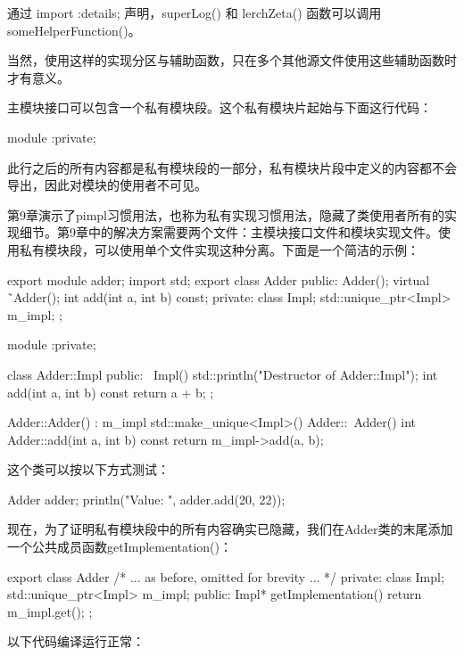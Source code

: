 通过 import :details; 声明，superLog() 和 lerchZeta() 函数可以调用 someHelperFunction()。

当然，使用这样的实现分区与辅助函数，只在多个其他源文件使用这些辅助函数时才有意义。


主模块接口可以包含一个私有模块段。这个私有模块片起始与下面这行代码：

\begin{cpp}
module :private;
\end{cpp}

此行之后的所有内容都是私有模块段的一部分，私有模块片段中定义的内容都不会导出，因此对模块的使用者不可见。

第9章演示了pimpl习惯用法，也称为私有实现习惯用法，隐藏了类使用者所有的实现细节。第9章中的解决方案需要两个文件：主模块接口文件和模块实现文件。使用私有模块段，可以使用单个文件实现这种分离。下面是一个简洁的示例：

\begin{cpp}
export module adder;
import std;
export class Adder
{
    public:
    Adder();
    virtual ˜Adder();
    int add(int a, int b) const;
    private:
    class Impl;
    std::unique_ptr<Impl> m_impl;
};

module :private;

class Adder::Impl
{
    public:
    ~Impl() { std::println("Destructor of Adder::Impl"); }
    int add(int a, int b) const { return a + b;}
};

Adder::Adder() : m_impl { std::make_unique<Impl>() } { }
Adder::~Adder() {}
int Adder::add(int a, int b) const { return m_impl->add(a, b); }
\end{cpp}

这个类可以按以下方式测试：

\begin{cpp}
Adder adder;
println("Value: {}", adder.add(20, 22));
\end{cpp}

现在，为了证明私有模块段中的所有内容确实已隐藏，我们在Adder类的末尾添加一个公共成员函数getImplementation()：

\begin{cpp}
export class Adder
{
    /* ... as before, omitted for brevity ... */
    private:
        class Impl;
        std::unique_ptr<Impl> m_impl;
    public:
        Impl* getImplementation() { return m_impl.get(); }
};
\end{cpp}

以下代码编译运行正常：

